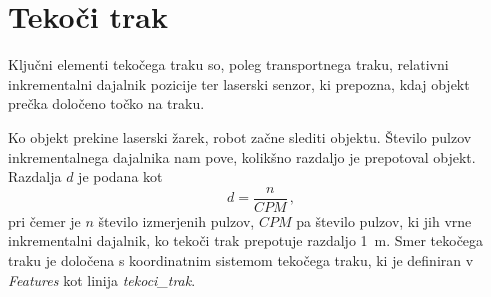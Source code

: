 %
%
%
%
%


\section{Tekoči trak}

Ključni elementi tekočega traku so, poleg transportnega traku, relativni inkrementalni dajalnik pozicije ter laserski senzor, ki prepozna, kdaj objekt prečka določeno točko na traku.

Ko objekt prekine laserski žarek, robot začne slediti objektu. Število pulzov inkrementalnega dajalnika nam pove, kolikšno razdaljo je prepotoval objekt. Razdalja $d$ je podana kot
\begin{equation}\
  d = \frac{n}{CPM} \, ,
\end{equation}
pri čemer je $n$ število izmerjenih pulzov, $CPM$ pa število pulzov, ki jih vrne inkrementalni dajalnik, ko tekoči trak prepotuje razdaljo 1~m. Smer tekočega traku je določena s koordinatnim sistemom tekočega traku, ki je definiran v \emph{Features} kot linija \emph{tekoci\_trak}.

